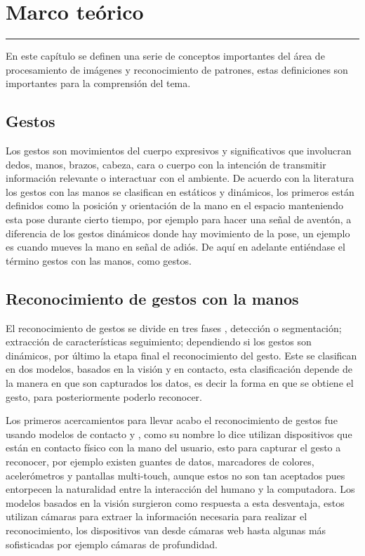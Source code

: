 \chapter{Marco te\'orico}\label{capit:cap2}
\vspace{-2.0325ex}%
\noindent
\rule{\textwidth}{0.5pt}
\vspace{-5.5ex}%
\newcommand{\pushline}{\Indp}%

En este capítulo se definen una serie de conceptos importantes del área de procesamiento de imágenes y reconocimiento de patrones, estas definiciones son importantes para la comprensión del tema.



\section{Gestos}\label{sec:2Gestos}
Los gestos \citep{Mitra2007} son movimientos del cuerpo expresivos y significativos que involucran dedos, manos, brazos, cabeza, cara o cuerpo con la intención de transmitir información relevante o interactuar con el ambiente. De acuerdo con la literatura \citep{Mitra2007} los gestos con las manos se clasifican en estáticos y dinámicos, los primeros están definidos como la posición y orientación de la mano en el espacio manteniendo esta pose durante cierto tiempo, por ejemplo para hacer una se\~nal de aventón, a diferencia de los gestos dinámicos donde hay movimiento de la pose, un ejemplo  es cuando mueves la mano en se\~nal de adiós. De aquí en adelante entiéndase el término gestos con las manos, como gestos.  



\section{Reconocimiento de gestos con la manos}\label{sec:2ReconocimientoGestos}  

El reconocimiento de gestos se divide en tres fases \citep{Rautaray2012}, detección o segmentación; extracción de características seguimiento; dependiendo si los gestos son dinámicos, por último la etapa final el reconocimiento del gesto.  
Este se clasifican en dos modelos, basados en la visión y en contacto, esta clasificación depende de la manera en que son capturados los datos, es decir la forma en que se obtiene el gesto, para posteriormente poderlo reconocer. 

Los primeros acercamientos para llevar acabo el reconocimiento de gestos fue usando modelos de contacto \citep{Rautaray2012} y \citep{Nayakwadi2014}, como su nombre lo dice utilizan dispositivos que est\'an en contacto f\'isico con la mano del usuario, esto para capturar el gesto a reconocer, por ejemplo existen guantes de datos, marcadores de colores, acelerómetros y pantallas multi-touch, aunque estos no son tan aceptados pues entorpecen la naturalidad entre la interacción del humano y la computadora. Los modelos basados en la visión surgieron como respuesta a esta desventaja, estos utilizan cámaras para extraer la información necesaria para realizar el reconocimiento, los dispositivos van desde c\'amaras web hasta algunas más sofisticadas por ejemplo c\'amaras de profundidad.  

